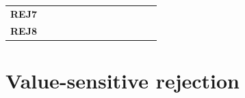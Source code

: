 \begin{table}
\begin{tabularx}{\textwidth}{ c *{12}{Y} }
    \textbf{REJ7} &                                   &                                       &                                         &                                           &                                        &                                         &             &            &             &            &             &            \\
    \textbf{REJ8} &                                   &                                       &                                         &                                           &                                        &                                         &             &            &             &            &             & \\
    \bottomrule
\end{tabularx}
\end{table}

\section{Value-sensitive rejection}
\label{sec:results-rejector}
